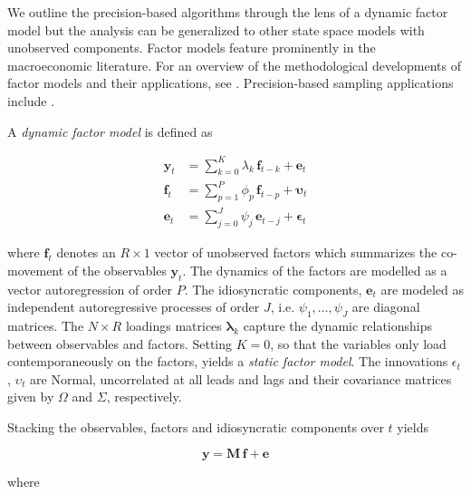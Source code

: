 \documentclass[notitlepage,a4paper,12pt]{article}
\begin{document}
We outline the precision-based algorithms through the lens of a dynamic factor model but the analysis can be generalized to other state space models with unobserved components. Factor models feature prominently in the macroeconomic literature. For an overview of the methodological developments of factor models and their applications, see \citet{stockwatson2016_hbmacro}. Precision-based sampling applications include \citet{chanjeliazkov_2009,mccausland_factor2015,kaufmannschumacher_jae2017,kaufmannschumacher_jectrcs2019}.

A \textit{dynamic factor model} is defined as

\begin{subequations}
    \label{eqn:factormodel}
    \begin{align}
        \mathbf{y}_t &= \sum_{k=0}^K \lambda_k \, \mathbf{f}_{t-k} + \mathbf{e}_t \label{eqn:facmod_obs}\\ 
        \mathbf{f}_t &= \sum_{p=1}^P \phi_p \, \mathbf{f}_{t-p} + \boldsymbol{\upsilon}_t \label{eqn:facmod_factors}\\
        \mathbf{e}_t &= \sum_{j=0}^J \psi_j \, \mathbf{e}_{t-j} + \boldsymbol{\epsilon}_t \label{eqn:facmod_idios}
    \end{align}
\end{subequations}

where $\mathbf{f}_t$ denotes an $R \times 1$ vector of unobserved factors which summarizes the co-movement of the observables $\mathbf{y}_t$. The dynamics of the factors are modelled as a vector autoregression of order $P$. The idiosyncratic components, $\mathbf{e}_t$ are modeled as independent autoregressive processes of order $J$, i.e. $\psi_1, \dots, \psi_J$ are diagonal matrices. The $N \times R$ loadings matrices $\mathbf{\lambda}_k$ capture the dynamic relationships between observables and factors. Setting $K=0$, so that the variables only load contemporaneously on the factors, yields a \textit{static factor model}. The innovations $\epsilon_t$, $\upsilon_t$ are Normal, uncorrelated at all leads and lags and their covariance matrices given by $\Omega$ and $\Sigma$, respectively. 

Stacking the observables, factors and idiosyncratic components over $t$ yields 

\begin{equation}
    \mathbf{y} = \mathbf{M} \, \mathbf{f} + \mathbf{e}
\end{equation} 

\noindent where 
\end{document}
